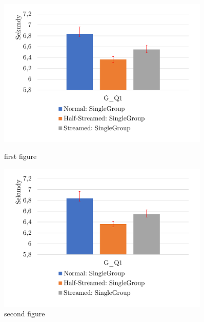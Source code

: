 \begin{figure}[!htp]
    \centering
    \begin{minipage}{0.45\textwidth}
        \centering
        \includegraphics[width=0.9\textwidth]{../img/aa.pdf} %
        \caption{first figure}
    \end{minipage}\hfill
    \begin{minipage}{0.45\textwidth}
        \centering
        \includegraphics[width=0.9\textwidth]{../img/aa.pdf} %
        \caption{second figure}
    \end{minipage}
\end{figure}